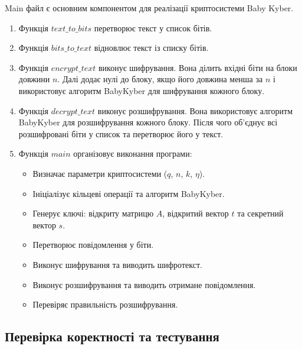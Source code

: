 Main файл є основним компонентом для реалізації криптосистеми Baby Kyber.
\begin{enumerate}
    \item Функція $text\_to\_bits$ перетворює текст у список бітів.

    \item Функція $bits\_to\_text$ відновлює текст із списку бітів.

    \item Функція $encrypt\_text$ виконує шифрування. Вона ділить вхідні біти на блоки довжини $n$. Далі додає нулі до блоку, якщо його довжина менша за $n$ і використовує алгоритм BabyKyber для шифрування кожного блоку.

    \item Функція $decrypt\_text$ виконує розшифрування. Вона використовує алгоритм BabyKyber для розшифрування кожного блоку. Після чого об'єднує всі розшифровані біти у список та перетворює його у текст.

    \item Функція $main$ організовує виконання програми:
    \begin{itemize}
        \item Визначає параметри криптосистеми ($q$, $n$, $k$, $\eta$).
        \item Ініціалізує кільцеві операції та алгоритм BabyKyber.
        \item Генерує ключі: відкриту матрицю $A$, відкритий вектор $t$ та секретний вектор $s$.
        \item Перетворює повідомлення у біти.
        \item Виконує шифрування та виводить шифротекст.
        \item Виконує розшифрування та виводить отримане повідомлення.
        \item Перевіряє правильність розшифрування.
    \end{itemize}
\end{enumerate}

\subsection*{Перевірка коректності та тестування}

